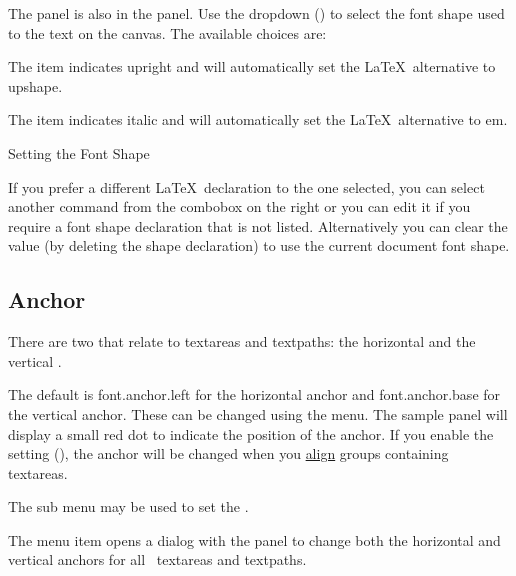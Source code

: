 
The  panel is also in the 
panel. Use the \gls{dropdown} () to
select the font shape used to  the
text on the \gls{canvas}.
The available choices are:


The  item indicates upright and
will automatically set the \LaTeX\ alternative to \gls{upshape}.


The  item indicates italic and
will automatically set the \LaTeX\ alternative to \gls{em}.

{}
{Setting the Font Shape}

If you prefer a different \LaTeX\ declaration to the one selected,
you can select another command from the \gls{combobox} on the right
or you can edit it if you require a font shape declaration that is
not listed.  Alternatively you can clear the value (by deleting the
shape declaration) to use the current document font shape.

\subsection{Anchor}\label{sec:fontanchor}

There are two 
that relate to \glspl{textarea} and \glspl{textpath}: the horizontal
 and the vertical .

The default is \gls{font.anchor.left} for the horizontal anchor and
\gls{font.anchor.base} for the vertical anchor. These can be changed
using the  menu. The sample panel will
display a small red dot to indicate the position of the anchor. If
you enable the  setting
(), the anchor will be changed when
you \hyperref[sec:alignobjects]{align} groups containing \glspl{textarea}.


The  sub menu may be used to set the
.


The  menu item opens a dialog
with the  panel to change both the horizontal
and vertical anchors for all \selected\ \glspl{textarea} and
\glspl{textpath}.

